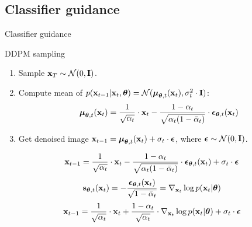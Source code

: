 \subsection{Classifier guidance}
\begin{frame}{Classifier guidance}
	
	\begin{block}{DDPM sampling}
		\begin{enumerate}
			\item Sample $\mathbf{x}_T \sim \mathcal{N}(0, \mathbf{I})$.
			\item Compute mean of $p(\mathbf{x}_{t-1} | \mathbf{x}_t, \boldsymbol{\theta}) = \mathcal{N}(\boldsymbol{\mu}_{\boldsymbol{\theta}, t}(\mathbf{x}_t), \sigma_t^2 \cdot \mathbf{I})$:
			\[
				\boldsymbol{\mu}_{\boldsymbol{\theta}, t}(\mathbf{x}_t) = \frac{1}{\sqrt{\alpha_t}} \cdot \mathbf{x}_t - \frac{1 - \alpha_t}{\sqrt{\alpha_t (1 - \bar{\alpha}_t)}} \cdot \boldsymbol{\epsilon}_{\boldsymbol{\theta}, t}(\mathbf{x}_t)
			\]
			\vspace{-0.3cm}
			\item Get denoised image $\mathbf{x}_{t - 1} = \boldsymbol{\mu}_{\boldsymbol{\theta}, t}(\mathbf{x}_t) +  \sigma_t \cdot \boldsymbol{\epsilon}$, where $\boldsymbol{\epsilon} \sim \mathcal{N}(0, \mathbf{I})$.
		\end{enumerate}
	\end{block}
	\vspace{-0.5cm}
	\[
		\mathbf{x}_{t - 1} = \frac{1}{\sqrt{\alpha_t}} \cdot \mathbf{x}_t - \frac{1 - \alpha_t}{\sqrt{\alpha_t (1 - \bar{\alpha}_t)}} \cdot \boldsymbol{\epsilon}_{\boldsymbol{\theta}, t}(\mathbf{x}_t) +  \sigma_t \cdot \boldsymbol{\epsilon}
	\]
	\[
		\mathbf{s}_{\boldsymbol{\theta}, t}(\mathbf{x}_t) = - \frac{\boldsymbol{\epsilon}_{\boldsymbol{\theta}, t}(\mathbf{x}_t)}{\sqrt{1 - \bar{\alpha}_t}} = \nabla_{\mathbf{x}_t} \log p(\mathbf{x}_t | \boldsymbol{\theta})
	\]
	\[
		\mathbf{x}_{t - 1} = \frac{1}{\sqrt{\alpha_t}} \cdot \mathbf{x}_t + \frac{1 - \alpha_t}{\sqrt{\alpha_t}} \cdot  \nabla_{\mathbf{x}_t} \log p(\mathbf{x}_t | \boldsymbol{\theta}) +  \sigma_t \cdot \boldsymbol{\epsilon}
	\]
\end{frame}
